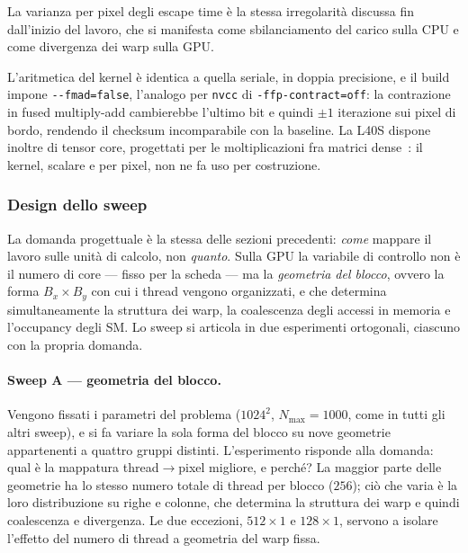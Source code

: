 La varianza per pixel degli escape time è la stessa irregolarità discussa fin
dall'inizio del lavoro, che si manifesta come sbilanciamento del carico sulla CPU
e come divergenza dei warp sulla GPU.

L'aritmetica del kernel è identica a quella seriale, in doppia precisione, e il
build impone \texttt{-{}-fmad=false}, l'analogo per \texttt{nvcc} di
\texttt{-ffp-contract=off}: la contrazione in fused multiply-add cambierebbe
l'ultimo bit e quindi $\pm 1$ iterazione sui pixel di bordo, rendendo il checksum
incomparabile con la baseline. La L40S dispone inoltre di tensor core, progettati
per le moltiplicazioni fra matrici dense~\cite{nvidia_ada_arch}: il kernel,
scalare e per pixel, non ne fa uso per costruzione.

\subsubsection{Design dello sweep}
\label{sec:cuda-sweep}

La domanda progettuale è la stessa delle sezioni precedenti: \emph{come} mappare
il lavoro sulle unità di calcolo, non \emph{quanto}. Sulla GPU la variabile di
controllo non è il numero di core --- fisso per la scheda --- ma la
\emph{geometria del blocco}, ovvero la forma $B_x \times B_y$ con cui i thread vengono
organizzati, e che determina simultaneamente la struttura dei warp, la
coalescenza degli accessi in memoria e l'occupancy degli SM. Lo sweep si articola
in due esperimenti ortogonali, ciascuno con la propria domanda.

\paragraph{Sweep A --- geometria del blocco.}
Vengono fissati i parametri del problema ($1024^2$, $N_{\max}=1000$, come in
tutti gli altri sweep), e si fa variare la sola forma del blocco su nove
geometrie appartenenti a quattro gruppi distinti. L'esperimento risponde alla
domanda: qual è la mappatura thread$\to$pixel migliore, e perché?
La maggior parte delle geometrie ha lo stesso numero totale di thread
per blocco ($256$); ciò che varia è la loro distribuzione su righe e colonne,
che determina la struttura dei warp e quindi coalescenza e divergenza. Le due
eccezioni, $512{\times}1$ e $128{\times}1$, servono a isolare l'effetto
del numero di thread a geometria del warp fissa.

